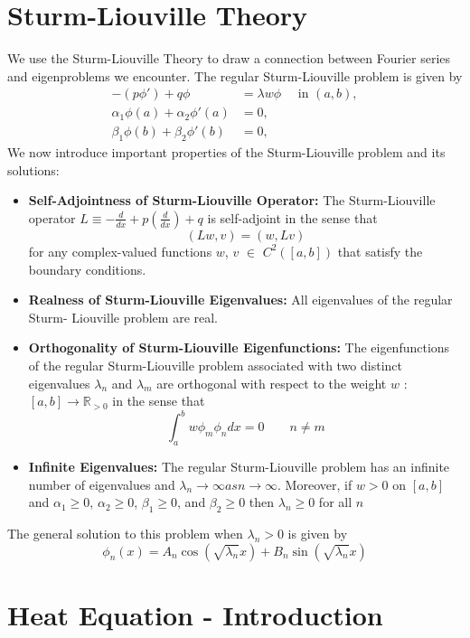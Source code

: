 \documentclass[11pt]{article}
\newcommand{\R}{\mathbb{R}}
\begin{document}
\section{Sturm-Liouville Theory}
We use the Sturm-Liouville Theory to draw a connection between Fourier series and eigenproblems we encounter. The regular Sturm-Liouville problem is given
by
 \begin{align*}
-(p \phi ') + q\phi &= \lambda w \phi \quad \text{  in  } (a,b), \\
\alpha_1 \phi (a) + \alpha_2 \phi '(a) &= 0, \\
\beta_1 \phi (b) + \beta_2 \phi '(b) &= 0, 
 \end{align*}
We now introduce important properties of the Sturm-Liouville problem and its solutions:
\begin{itemize}
\item \textbf{Self-Adjointness of Sturm-Liouville Operator:} The Sturm-Liouville operator $ L \equiv - \frac{d}{dx} + p (\frac{d}{dx}) + q$ is self-adjoint in the sense that 
$$ (Lw, v) = (w, Lv) $$ 
for any complex-valued functions $w$, $v$ $\in$ $C^2([a,b])$ that satisfy the boundary conditions.
\item \textbf{Realness of Sturm-Liouville Eigenvalues:} All eigenvalues of the regular Sturm- Liouville problem are real.
\item \textbf{Orthogonality of Sturm-Liouville Eigenfunctions:} The eigenfunctions of the regular Sturm-Liouville problem associated with two distinct eigenvalues $\lambda_n$ and $\lambda_m$ are orthogonal with respect to the weight $w$ : $[a, b] \rightarrow \R_{>0}$ in the sense that
$$ \int_a^{b} w \phi_m \phi_n dx = 0 \quad \quad n \neq m $$
\item \textbf{Infinite Eigenvalues:} The regular Sturm-Liouville problem has an infinite number of eigenvalues and $\lambda_n \rightarrow \infty as n \rightarrow \infty$.  Moreover, if $w > 0$ on $[a,b]$ and $\alpha_1 \geq 0$, $\alpha_2 \geq 0$, $\beta_1 \geq 0$, and $\beta_2 \geq 0$ then $\lambda_n \geq 0$ for all $n$
\end{itemize}
The general solution to this problem when $\lambda_n > 0$ is given by
$$ \phi_n(x) = A_n \cos ( \sqrt{\lambda_n} x) + B_n \sin ( \sqrt{\lambda_n} x)$$
\pagebreak


\section{Heat Equation - Introduction}
\end{document}
